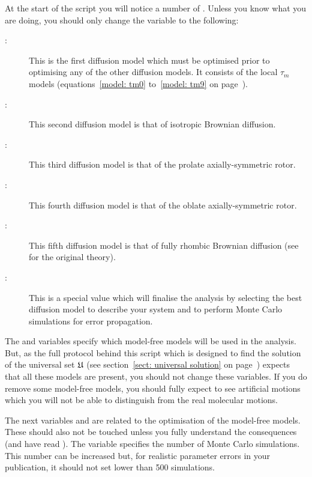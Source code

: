 \begin{htmlonly}
\begin{htmlonly}
At the start of the script you will notice a number of .  Unless you know what you are doing, you should only change the  variable to the following:

\begin{description}
\item[:]  This is the first diffusion model which must be optimised prior to optimising any of the other diffusion models.  It consists of the local $\tau_m$ models (equations~\ref{model: tm0} to~\ref{model: tm9} on page~\pageref{model: tm0}).
\item[:]  This second diffusion model is that of isotropic Brownian diffusion.
\item[:]  This third diffusion model is that of the prolate axially-symmetric rotor.
\item[:]  This fourth diffusion model is that of the oblate axially-symmetric rotor.
\item[:]  This fifth diffusion model is that of fully rhombic Brownian diffusion (see \citet{Perrin34,Perrin36} for the original theory).
\item[:]  This is a special value which will finalise the analysis by selecting the best diffusion model to describe your system and to perform Monte Carlo simulations for error propagation.
\end{description}

The  and   variables specify which model-free models will be used in the analysis.  But, as the full protocol behind this script which is designed to find the solution of the universal set $\mathfrak{U}$ (see section~\ref{sect: universal solution} on page~\pageref{sect: universal solution}) expects that all these models are present, you should not change these variables.  If you do remove some model-free models, you should fully expect to see artificial motions which you will not be able to distinguish from the real molecular motions.

The next variables  and  are related to the optimisation of the model-free models.  These should also not be touched unless you fully understand the consequences (and have read \citet{dAuvergneGooley08a}).  The variable  specifies the number of Monte Carlo simulations.  This number can be increased but, for realistic parameter errors in your publication, it should not set lower than 500 simulations.


\end{htmlonly}
\end{htmlonly}
